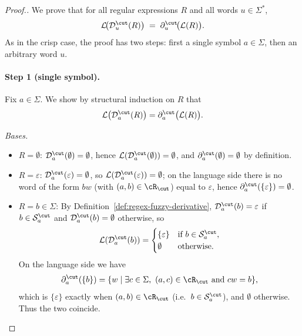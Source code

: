\begin{proof}[Proof.]
We prove that for all regular expressions $R$ and all words $u \in \Sigma^*$,
\[
  \mathcal{L}\!\bigl(\mathcal{D}^\cut_u(R)\bigr)
  \;=\;
  \partial^\cut_u\!\bigl(\mathcal{L}(R)\bigr).
\]
As in the crisp case, the proof has two steps: first a single symbol $a\in\Sigma$,
then an arbitrary word $u$.

\paragraph{Step 1 (single symbol).}
Fix $a \in \Sigma$. We show by structural induction on $R$ that
\[
  \mathcal{L}\bigl(\mathcal{D}^\cut_a(R)\bigr)
  = \partial^\cut_a\bigl(\mathcal{L}(R)\bigr).
\]

\smallskip
\noindent\emph{Bases.}
\begin{itemize}
  \item $R = \emptyset$:
    $\mathcal{D}^\cut_a(\emptyset)=\emptyset$, hence
    $\mathcal{L}(\mathcal{D}^\cut_a(\emptyset))=\emptyset$, and
    $\partial^\cut_a(\emptyset)=\emptyset$ by definition.
  \item $R = \varepsilon$:
    $\mathcal{D}^\cut_a(\varepsilon)=\emptyset$, so
    $\mathcal{L}(\mathcal{D}^\cut_a(\varepsilon))=\emptyset$; on the language side
    there is no word of the form $bw$ (with $(a,b)\in\cR_\cut$) equal to $\varepsilon$,
    hence $\partial^\cut_a(\{\varepsilon\})=\emptyset$.
  \item $R = b \in \Sigma$:
    By Definition~\ref{def:regex-fuzzy-derivative},
    $\mathcal{D}^\cut_a(b)=\varepsilon$ if $b \in \mathcal{S}^\cut_a$ and
    $\mathcal{D}^\cut_a(b)=\emptyset$ otherwise, so
    \[
      \mathcal{L}(\mathcal{D}^\cut_a(b)) =
      \begin{cases}
        \{\varepsilon\} & \text{if } b \in \mathcal{S}^\cut_a,\\
        \emptyset       & \text{otherwise.}
      \end{cases}
    \]
    On the language side we have
    \[
      \partial^\cut_a(\{b\})
      = \{ w \mid \exists c\in\Sigma,\ (a,c)\in\cR_\cut \ \text{and}\ cw=b \},
    \]
    which is $\{\varepsilon\}$ exactly when $(a,b)\in\cR_\cut$ (i.e.\ $b\in\mathcal{S}^\cut_a$),
    and $\emptyset$ otherwise. Thus the two coincide.
\end{itemize}


\end{proof}

